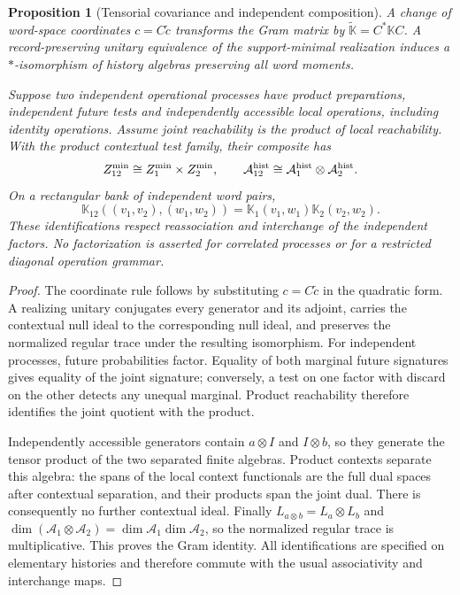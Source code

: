 \documentclass[11pt]{article}
\numberwithin{equation}{section}
\newtheorem{proposition}[proposition]{Proposition}
\theoremstyle{definition}
\theoremstyle{remark}
\begin{document}
\begin{proposition}[Tensorial covariance and independent composition]
\label{prop:supp-grand-monoidal}
A change of word-space coordinates $c=C\widetilde c$ transforms the Gram
matrix by $\widetilde{\mathbb K}=C^*\mathbb K C$. A record-preserving
unitary equivalence of the support-minimal realization induces a
$*$-isomorphism of history algebras preserving all word moments.

Suppose two independent operational processes have product preparations,
independent future tests and independently accessible local operations,
including identity operations. Assume joint reachability is the product of
local reachability. With the product contextual test family, their composite
has
\begin{equation}
 Z_{12}^{\min}\cong Z_1^{\min}\times Z_2^{\min},\qquad
 \mathcal A_{12}^{\rm hist}\cong
 \mathcal A_1^{\rm hist}\otimes\mathcal A_2^{\rm hist}.
 \label{eq:supp-grand-product}
\end{equation}
On a rectangular bank of independent word pairs,
\begin{equation}
 \mathbb K_{12}((v_1,v_2),(w_1,w_2))
 =\mathbb K_1(v_1,w_1)\mathbb K_2(v_2,w_2).
 \label{eq:supp-grand-gram-product}
\end{equation}
These identifications respect reassociation and interchange of the independent
factors. No factorization is asserted for correlated processes or for a
restricted diagonal operation grammar.
\end{proposition}
\begin{proof}
The coordinate rule follows by substituting $c=C\widetilde c$ in the
quadratic form. A realizing unitary conjugates every generator and its
adjoint, carries the contextual null ideal to the corresponding null ideal,
and preserves the normalized regular trace under the resulting isomorphism.
For independent processes, future probabilities factor. Equality of both
marginal future signatures gives equality of the joint signature; conversely,
a test on one factor with discard on the other detects any unequal marginal.
Product reachability therefore identifies the joint quotient with the product.

Independently accessible generators contain $a\otimes I$ and $I\otimes b$,
so they generate the tensor product of the two separated finite algebras.
Product contexts separate this algebra: the spans of the local context
functionals are the full dual spaces after contextual separation, and their
products span the joint dual. There is consequently no further contextual
ideal. Finally
$L_{a\otimes b}=L_a\otimes L_b$ and
$\dim(\mathcal A_1\otimes\mathcal A_2)=\dim\mathcal A_1\dim\mathcal A_2$,
so the normalized regular trace is multiplicative. This proves the Gram
identity. All identifications are specified on elementary histories and
therefore commute with the usual associativity and interchange maps.
\end{proof}
\end{document}
